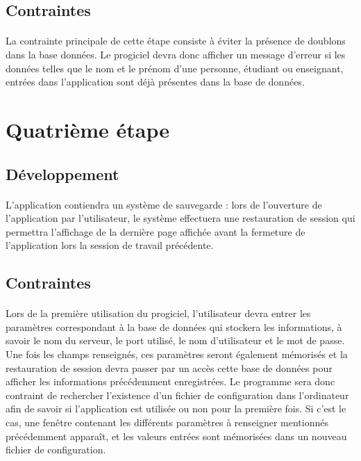 \documentclass[a4paper,10pt]{report}
\begin{document}
      \subsection{Contraintes}
	\paragraph{}
	La contrainte principale de cette étape consiste à éviter la présence de doublons dans la base données. 
	Le progiciel devra donc afficher un message d'erreur si les données telles que le nom et le prénom d'une personne, étudiant ou enseignant, entrées dans l'application sont déjà présentes dans la base de données. 
      
    \section{Quatrième étape}
      \subsection{Développement}
	\paragraph{}
      L’application contiendra un système de sauvegarde : lors de l’ouverture de l’application par l’utilisateur, le système effectuera une restauration de session qui permettra l’affichage de la dernière page affichée avant la fermeture de l’application lors la session de travail précédente.

      \subsection{Contraintes}
	\paragraph{}
      Lors de la première utilisation du progiciel, l'utilisateur devra entrer les paramètres correspondant à la base de données qui stockera les informations, à savoir le nom du serveur, le port utilisé, le nom d'utilisateur et le mot de passe.
      Une fois les champs renseignés, ces paramètres seront également mémorisés et la restauration de session devra passer par un accès cette base de données pour afficher les informations précédemment enregistrées.
      Le programme sera donc contraint de rechercher l'existence d'un fichier de configuration dans l'ordinateur afin de savoir si l'application est utilisée ou non pour la première fois.
      Si c'est le cas, une fenêtre contenant les différents paramètres à renseigner mentionnés précédemment apparaît, et les valeurs entrées sont mémorisées dans un nouveau fichier de configuration.
      ~\\
      ~\\
      ~\\
\end{document}
